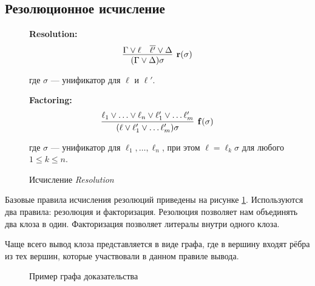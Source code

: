 \subsection{Резолюционное исчисление}
\begin{figure}
\begin{calculus}
\centering
\textbf{Resolution:}
$$
\infer[\mathbf{r}(\sigma)]
	  {(\Gamma \vee \Delta)\sigma}
      {\Gamma \vee \ell & \overline{\ell'} \vee \Delta}
$$

где $\sigma$ --- унификатор для $\ell$ и $\ell'$.

\bigskip

\textbf{Factoring:}
$$
\infer[\mathbf{f}(\sigma)]
      {(\ell \vee \ell'_1 \vee \ldots \ell'_m)\sigma}
      {\ell_1 \vee \ldots \vee \ell_n \vee \ell'_1 \vee \ldots \ell'_m}
$$

где $\sigma$ --- унификатор для $\ell_1, \ldots, \ell_n$, при этом $\ell = \ell_k \sigma$ для любого $1 \leq k \leq n$.
\end{calculus}
\caption{Исчисление \emph{Resolution}}
\label{fig:R}
\end{figure}

Базовые правила исчисления резолюций приведены на рисунке \ref{fig:R}. Используются два правила: резолюция и факторизация. Резолюция позволяет нам объединять два клоза в один. Факторизация позволяет  литералы внутри одного клоза.

Чаще всего вывод клоза представляется в виде графа, где в вершину входят рёбра из тех вершин, которые участвовали в данном правиле вывода. 

\usetikzlibrary{arrows.meta}
\begin{figure}
\caption{Пример графа доказательства}
\label{fig:graph-example}
\end{figure}

